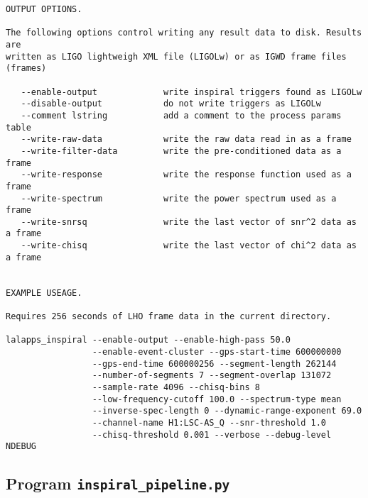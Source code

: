 \begin{verbatim}
OUTPUT OPTIONS.

The following options control writing any result data to disk. Results are
written as LIGO lightweigh XML file (LIGOLw) or as IGWD frame files (frames)

   --enable-output             write inspiral triggers found as LIGOLw
   --disable-output            do not write triggers as LIGOLw 
   --comment lstring           add a comment to the process params table
   --write-raw-data            write the raw data read in as a frame
   --write-filter-data         write the pre-conditioned data as a frame
   --write-response            write the response function used as a frame
   --write-spectrum            write the power spectrum used as a frame
   --write-snrsq               write the last vector of snr^2 data as a frame
   --write-chisq               write the last vector of chi^2 data as a frame


EXAMPLE USEAGE.

Requires 256 seconds of LHO frame data in the current directory.

lalapps_inspiral --enable-output --enable-high-pass 50.0
                 --enable-event-cluster --gps-start-time 600000000
                 --gps-end-time 600000256 --segment-length 262144
                 --number-of-segments 7 --segment-overlap 131072
                 --sample-rate 4096 --chisq-bins 8
                 --low-frequency-cutoff 100.0 --spectrum-type mean
                 --inverse-spec-length 0 --dynamic-range-exponent 69.0
                 --channel-name H1:LSC-AS_Q --snr-threshold 1.0
                 --chisq-threshold 0.001 --verbose --debug-level NDEBUG
\end{verbatim}

\clearpage
\subsection{Program \texttt{inspiral\_pipeline.py}}
\label{program:inspiral-pipeline}

